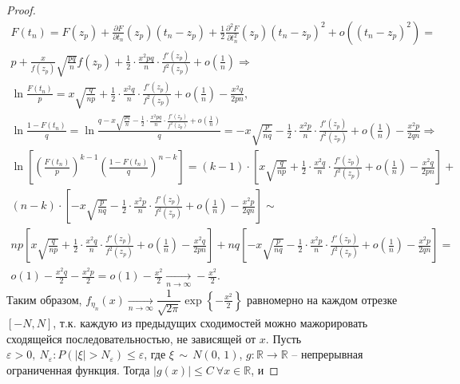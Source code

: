 \begin{proof}
\begin{gather*}
    F( t_{n}) =F( z_{p}) +\frac{\partial F}{\partial t_{n}}( z_{p})( t_{n} -z_{p}) +\frac{1}{2}\frac{\partial ^{2} F}{\partial t_{n}^{2}}( z_{p})( t_{n} -z_{p})^{2} +o\left(( t_{n} -z_{p})^{2}\right) =\\ p+\frac{x}{f( z_{p})}\sqrt{\frac{pq}{n}} f( z_{p}) +\frac{1}{2} \cdotp \frac{x^{2} pq}{n} \cdotp \frac{f'( z_{p})}{f^{2}( z_{p})} +o\left(\frac{1}{n}\right) \Rightarrow \\
    \ln\frac{F( t_{n})}{p} =x\sqrt{\frac{q}{np}} +\frac{1}{2} \cdotp \frac{x^{2} q}{n} \cdotp \frac{f'( z_{p})}{f^{2}( z_{p})} +o\left(\frac{1}{n}\right) -\frac{x^{2} q}{2pn} ,\\
    \ln\frac{1-F( t_{n})}{q} =\ln\frac{q-x\sqrt{\frac{pq}{n}} -\frac{1}{2} \cdotp \frac{x^{2} pq}{n} \cdotp \frac{f'( z_{p})}{f^{2}( z_{p})} +o\left(\frac{1}{n}\right)}{q} =-x\sqrt{\frac{p}{nq}} -\frac{1}{2} \cdotp \frac{x^{2} p}{n} \cdotp \frac{f'( z_{p})}{f^{2}( z_{p})} +o\left(\frac{1}{n}\right) -\frac{x^{2} p}{2qn} \Rightarrow \\
    \ln\left[\left(\frac{F( t_{n})}{p}\right)^{k-1}\left(\frac{1-F( t_{n})}{q}\right)^{n-k}\right] =( k-1) \cdotp \left[ x\sqrt{\frac{q}{np}} +\frac{1}{2} \cdotp \frac{x^{2} q}{n} \cdotp \frac{f'( z_{p})}{f^{2}( z_{p})} +o\left(\frac{1}{n}\right) -\frac{x^{2} q}{2pn}\right] +\\ ( n-k) \cdotp \left[ -x\sqrt{\frac{p}{nq}} -\frac{1}{2} \cdotp \frac{x^{2} p}{n} \cdotp \frac{f'( z_{p})}{f^{2}( z_{p})} +o\left(\frac{1}{n}\right) -\frac{x^{2} p}{2qn}\right]\sim\\ np\left[ x\sqrt{\frac{q}{np}} +\frac{1}{2} \cdotp \frac{x^{2} q}{n} \cdotp \frac{f'( z_{p})}{f^{2}( z_{p})} +o\left(\frac{1}{n}\right) -\frac{x^{2} q}{2pn}\right] +nq\left[ -x\sqrt{\frac{p}{nq}} -\frac{1}{2} \cdotp \frac{x^{2} p}{n} \cdotp \frac{f'( z_{p})}{f^{2}( z_{p})} +o\left(\frac{1}{n}\right) -\frac{x^{2} p}{2qn}\right] =\\ o( 1) -\frac{x^{2} q}{2} -\frac{x^{2} p}{2} =o( 1) -\frac{x^{2}}{2}\xrightarrow[n\rightarrow \infty ]{} -\frac{x^{2}}{2} .
\end{gather*}
Таким образом, $\displaystyle f_{\eta _{n}}( x)\xrightarrow[n\rightarrow \infty ]{}\dfrac{1}{\sqrt{2\pi }} \exp\left\{-\frac{x^{2}}{2}\right\}$ равномерно на каждом отрезке $\displaystyle [ -N,N]$, т.к. каждую из предыдущих сходимостей можно мажорировать сходящейся последовательностью, не зависящей от $\displaystyle x$. Пусть $\displaystyle \varepsilon  >0,\ N_{\varepsilon } :P(| \xi |  >N_{\varepsilon }) \leqslant \varepsilon $, где $\displaystyle \xi\, \sim\, N( 0,\, 1)$, $\displaystyle g:\mathbb{R}\rightarrow \mathbb{R}$ -- непрерывная ограниченная функция. Тогда $\vert g(x)\vert \leq C\ \forall x \in \mathbb{R}$, и

\end{proof}
